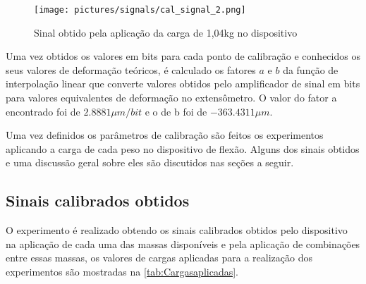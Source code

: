 \begin{figure}[H]
	\caption{\label{fig:420} Sinal obtido pela aplicação da carga de 1,04kg no dispositivo}
	\begin{center}
		\texttt{[image: pictures/signals/cal\_signal\_2.png]}
	\end{center}
\end{figure}

Uma vez obtidos os valores em bits para cada ponto de calibração e conhecidos os seus valores de deformação teóricos, é calculado os fatores $ a $ e $ b $ da função de interpolação
linear que converte valores obtidos pelo amplificador de sinal em bits para valores equivalentes de deformação no extensômetro.
O valor do fator a encontrado foi de $ 2.8881 {\mu}m/bit $ e o de b foi de $ -363.4311 {\mu}m $.

Uma vez definidos os parâmetros de calibração são feitos os experimentos aplicando a carga de cada peso no dispositivo de flexão.
Alguns dos sinais obtidos e uma discussão geral sobre eles são discutidos nas seções a seguir.

\subsection{Sinais calibrados obtidos}

O experimento é realizado obtendo os sinais calibrados obtidos pelo dispositivo na aplicação de cada uma das massas disponíveis e pela aplicação de combinações entre essas massas,
os valores de cargas aplicadas para a realização dos experimentos são mostradas na \autoref{tab:Cargasaplicadas}.

\begin{table}[H]
    \caption{Cargas aplicadas para os experimentos}
    \label{tab:Cargasaplicadas}
    \centering
\end{table}

